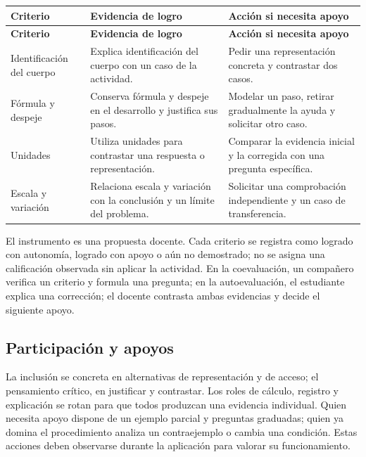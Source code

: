 \documentclass[spanish,letterpaper,oneside]{article}
\begin{document}
{\small{}\renewcommand{\arraystretch}{1.25}
\begin{longtable}{|>{\raggedright\arraybackslash}p{}|>{\raggedright\arraybackslash}p{}|>{\raggedright\arraybackslash}p{}|}\hline
\rowcolor{iiiepePale} \textbf{Criterio} & \textbf{Evidencia de logro} & \textbf{Acción si necesita apoyo} \\\hline
\endfirsthead
\hline
\rowcolor{iiiepePale} \textbf{Criterio} & \textbf{Evidencia de logro} & \textbf{Acción si necesita apoyo} \\\hline
\endhead
Identificación del cuerpo & Explica identificación del cuerpo con un caso de la actividad. & Pedir una representación concreta y contrastar dos casos. \\\hline
Fórmula y despeje & Conserva fórmula y despeje en el desarrollo y justifica sus pasos. & Modelar un paso, retirar gradualmente la ayuda y solicitar otro caso. \\\hline
Unidades & Utiliza unidades para contrastar una respuesta o representación. & Comparar la evidencia inicial y la corregida con una pregunta específica. \\\hline
Escala y variación & Relaciona escala y variación con la conclusión y un límite del problema. & Solicitar una comprobación independiente y un caso de transferencia. \\\hline
\end{longtable}}
El instrumento es una propuesta docente. Cada criterio se registra como logrado con autonomía, logrado con apoyo o aún no demostrado; no se asigna una calificación observada sin aplicar la actividad. En la coevaluación, un compañero verifica un criterio y formula una pregunta; en la autoevaluación, el estudiante explica una corrección; el docente contrasta ambas evidencias y decide el siguiente apoyo.\subsection{Participación y apoyos}
La inclusión se concreta en alternativas de representación y de acceso; el pensamiento crítico, en justificar y contrastar. Los roles de cálculo, registro y explicación se rotan para que todos produzcan una evidencia individual. Quien necesita apoyo dispone de un ejemplo parcial y preguntas graduadas; quien ya domina el procedimiento analiza un contraejemplo o cambia una condición. Estas acciones deben observarse durante la aplicación para valorar su funcionamiento.
\end{document}
